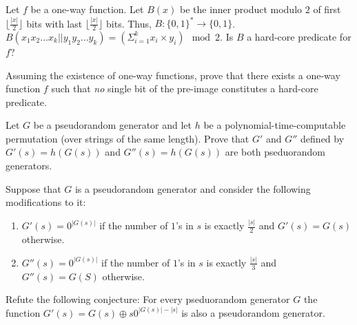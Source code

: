 \documentclass[11pt]{exam}
\begin{document}
\begin{questions}
\question[10]  
Let $f$ be a one-way function. Let $B(x)$ be the inner product modulo $2$ of first $\lfloor \frac{|x|}{2} \rfloor$ bits with last $\lfloor \frac{|x|}{2} \rfloor$ bits. Thus, $B:\{0,1\}^* \to \{0,1\}$. $B(x_1x_2...x_k||y_1y_2...y_k)=(\Sigma_{i=1}^k x_i \times y_i) \mod 2$. Is $B$ a hard-core predicate for $f$?

\question[10] 
Assuming the existence of one-way functions, prove that there exists a one-way function $f$ such that \textit{no} single bit of the pre-image constitutes a hard-core predicate. 

\question[10] 
Let $G$ be a pseudorandom generator and let $h$ be a polynomial-time-computable permutation (over strings of the same length). Prove that $G'$ and $G''$ defined by $G'(s)=h(G(s))$ and $G''(s)=h(G(s))$ are both pseduorandom generators. 

\question[10]  
Suppose that $G$ is a pseudorandom generator and consider the following modifications to it:
\begin{enumerate}
    \item $G'(s)=0^{|G(s)|}$ if the number of $1$'s in $s$ is exactly $\frac{|s|}{2}$ and $G'(s)=G(s)$ otherwise.
    \item $G''(s)=0^{|G(s)|}$ if the number of $1$'s in $s$ is exactly $\frac{|s|}{3}$ and $G''(s)=G(S)$ otherwise. 
\end{enumerate}

\question[10]  
Refute the following conjecture: For every pseduorandom generator $G$ the function $G'(s)=G(s) \oplus s0^{|G(s)|-|s|}$ is also a pseudorandom generator. 

\end{questions}
\end{document}
